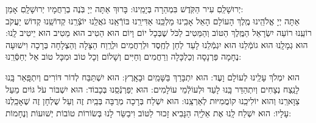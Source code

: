 \documentclass[a4paper, twoside, openany, parskip=half, 10pt]{article}
\begin{document}
\begin{multicols}{2}
\begin{sometimes}
\end{sometimes}

 יְרוּשָׁלַֽםִ עִיר הַקֹּֽדֶשׁ בִּמְהֵרָה בְּיָמֵֽינוּ: בָּרוּךְ אַתָּה יְיָ בֹּֽנֶה בְרַחֲמָיו יְרוּשָׁלָֽםִ אָמֵן:\\

%
%
%
%
%
%
%
%


 אַתָּה יְיָ אֱלֹהֵֽינוּ מֶֽלֶךְ הָעוֹלָם הָאֵל אָבִֽינוּ מַלְכֵּֽנוּ אַדִּירֵֽנוּ בּוֹרְֿאֵֽנוּ גֹאֲלֵֽנוּ יוֹצְֿרֵֽנוּ קְדוֹשֵֽׁנוּ קְדוֹשׁ יַעֲקֹב רוֹעֵֽנוּ רוֹעֵה יִשְׂרָאֵל הַמֶּֽלֶךְ הַטּוֹב וְהַמֵּטִיב לַכֹּל שֶׁבְּכָל יוֹם וָיוֹם הוּא הֵטִיב הוּא מֵטִיב הוּא יֵיטִיב לָֽנוּ: הוּא גְמָלָֽנוּ הוּא גוֹמְֿלֵנוּ הוּא יִגְמְֿלֵנוּ לָעַד לְחֵן לְחֶֽסֶד וּלְרַחֲמִים וּלְרֶֽוַח הַצָּלָה וְהַצְלָחָה בְּרָכָה וִישׁוּעָה נֶחָמָה פַּרְנָסָה וְכַלְכָּלָה וְרַחֲמִים וְחַיִּים וְשָׁלוֹם וְכָל טוֹב וּמִכָּל טוֹב אַל יְחַסְּֿרֵֽנוּ:\\ 


 הוּא יִמְלֹךְ עָלֵֽינוּ לְעוֹלָם וָעֶד: 
	 הוּא יִתְבָּרַךְ בַּשָּׁמַֽיִם וּבָאָֽרֶץ: 
	 הוּא יִשְׁתַּבַּח לְדוֹר דּוֹרִים וְיִתְפָּֽאַר בָּֽנוּ לָנֵֽצַח נְצָחִים 
		 וְיִתְהַדַּר בָּֽנוּ לָעַד וּלְעוֹלְֿמֵי עוֹלָמִים: 
	 הוּא יְפַרְנְֿסֵֽנוּ בְּכָבוֹד: 
	 הוּא יִשְׁבּוֹר עֹל גּוֹיִם מֵעַל צַוָּארֵֽנוּ וְהוּא יוֹלִיכֵֽנוּ קוֹמֲמִיּוּת לְאַרְצֵֽנוּ: 
	 הוּא יִשְׁלַח בְּרָכָה מְרֻבָּה בְּבַֽיִת זֶה וְעַל שֻׁלְחָן זֶה שֶׁאָכַֽלְנוּ עָלָיו: 
 הוּא יִשְׁלַח לָֽנוּ אֶת אֵלִיָּֽה הַנָּבִיא זָכוּר לַטּוֹב וִיבַשֵּׂר לָנוּ בְּשׂוֹרוֹת טוֹבוֹת יְשׁוּעוֹת וְנֶחָמוֹת:



\end{multicols}
\end{document}
